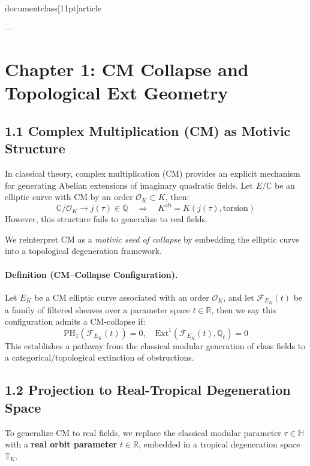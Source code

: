 \\documentclass[11pt]{article}
\begin{document}
---


\section*{Chapter 1: CM Collapse and Topological Ext Geometry}

\subsection*{1.1 Complex Multiplication (CM) as Motivic Structure}

In classical theory, complex multiplication (CM) provides an explicit mechanism for generating Abelian extensions of imaginary quadratic fields. Let \( E/\mathbb{C} \) be an elliptic curve with CM by an order \( \mathcal{O}_K \subset K \), then:
\[
\mathbb{C}/\mathcal{O}_K \longrightarrow j(\tau) \in \overline{\mathbb{Q}} \quad \Rightarrow \quad K^{\mathrm{ab}} = K(j(\tau), \text{torsion})
\]
However, this structure fails to generalize to real fields.

We reinterpret CM as a \emph{motivic seed of collapse} by embedding the elliptic curve into a topological degeneration framework.

\paragraph{Definition (CM–Collapse Configuration).}
Let \( E_K \) be a CM elliptic curve associated with an order \( \mathcal{O}_K \), and let \( \mathcal{F}_{E_K}(t) \) be a family of filtered sheaves over a parameter space \( t \in \mathbb{R} \), then we say this configuration admits a CM-collapse if:
\[
\mathrm{PH}_1(\mathcal{F}_{E_K}(t)) = 0, \quad \mathrm{Ext}^1(\mathcal{F}_{E_K}(t), \mathbb{Q}_\ell) = 0
\]
This establishes a pathway from the classical modular generation of class fields to a categorical/topological extinction of obstructions.

\subsection*{1.2 Projection to Real-Tropical Degeneration Space}

To generalize CM to real fields, we replace the classical modular parameter \( \tau \in \mathbb{H} \) with a \textbf{real orbit parameter} \( t \in \mathbb{R} \), embedded in a tropical degeneration space \( \mathbb{T}_K \).
\end{document}
